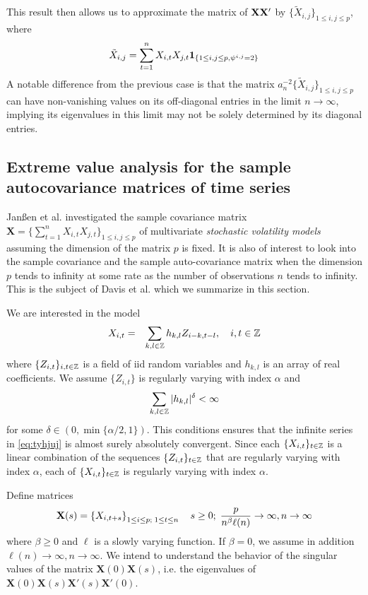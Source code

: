This result then allows us to approximate the matrix of $\mathbf{XX'}$
by
$\{\tilde X_{i,j}\}_{1 \leq i,j \leq p}$, where
\[
\tilde X_{i,j} = \sum_{t=1}^n X_{i,t} X_{j,t}
\mathbf{1}_{\{1 \leq i,j \leq p, \psi^{i,j} = 2\}}
\]
A notable difference from the previous case is that the matrix
$a_{n}^{-2}\{\tilde X_{i,j}\}_{1 \leq i,j \leq p}$ can have non-vanishing
values on its off-diagonal entries in the limit
$n \to \infty$, implying its eigenvalues in this limit may not be
solely determined by its diagonal entries.

\subsection{Extreme value analysis for the sample autocovariance matrices of time series}
Jan\ss en et al. \cite{janssen:mikosch:rezapour:xie:2016} investigated
the sample covariance matrix
$\mathbf X = \{\sum_{t=1}^n X_{i,t} X_{j,t}\}_{1 \leq i,j \leq p}$ of
multivariate {\em stochastic volatility models} assuming the dimension
of the matrix $p$ is fixed. It is also of interest to look into the
sample covariance and the sample auto-covariance matrix when the dimension
$p$ tends to infinity at some rate as the number of observations $n$ tends
to infinity. This is the subject of Davis et al.
\cite{davis:mikosch:heiny:xie:2015} which we summarize in this section.

We are interested in the model
\begin{eqnarray*}
  X_{i,t} &=& \sum_{k,l \in \mathbb Z} h_{k,l} Z_{i-k, t-l},
  \quad i,t \in \mathbb Z \label{eq:tyhjuj}
\end{eqnarray*}
where $\{Z_{i,t}\}_{i,t \in \mathbb Z}$ is a field of iid random
variables and $h_{k,l}$ is an array of real coefficients. We
assume $\{Z_{i,t}\}$ is regularly varying with index $\alpha$
and
\[
\sum_{k,l \in \mathbb Z} |h_{k,l}|^\delta < \infty
\]
for some $\delta \in (0, \min\{\alpha/2, 1\})$. This conditions ensures
that the infinite series in \eqref{eq:tyhjuj} is almost surely
absolutely convergent. Since each $\{X_{i,t}\}_{t \in \mathbb Z}$
is a linear combination of the sequences $\{Z_{i,t}\}_{t \in \mathbb Z}$
that are regularly varying with index $\alpha$, each of
$\{X_{i,t}\}_{t \in \mathbb Z}$ is regularly varying with index $\alpha$.

Define matrices
\[
\mathbf X(s) = \left\{X_{i, t+s}\right\}_{1 \leq i \leq p;\; 1 \leq t \leq n}
\quad
s \geq 0;\;
{p \over n^\beta \ell(n)} \to \infty, n \to \infty
\]
where $\beta \geq 0$ and $\ell$ is a slowly varying function.
If $\beta = 0$, we assume in addition $\ell(n) \to \infty, n\to\infty$.
We intend to understand the behavior of the singular values of the
matrix $\mathbf X(0) \mathbf X(s)$, i.e. the eigenvalues of
$\mathbf X(0) \mathbf X(s) \mathbf X'(s) \mathbf X'(0)$.

